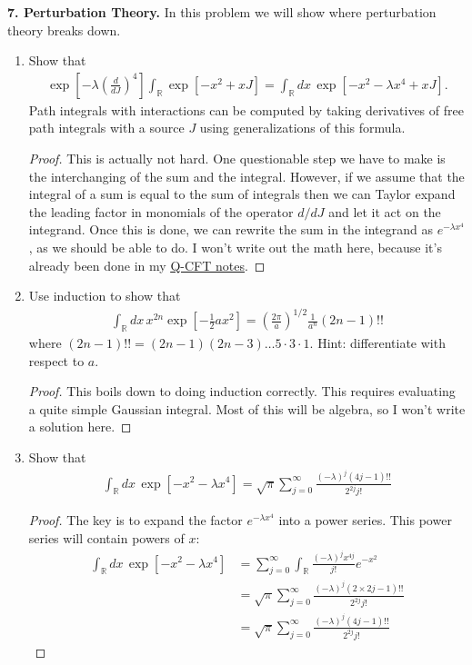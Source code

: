 \documentclass{book}
\theoremstyle{definition}
\newcommand{\R}{\mathbb{R}}
\newcommand{\nn}{\nonumber}
\newcommand{\f}[2]{\frac{#1}{#2}}
\newcommand{\lp}{\left(}
\newcommand{\rp}{\right)}
\newcommand{\lb}{\left[}
\newcommand{\rb}{\right]}
\begin{document}
\noindent \textbf{7. Perturbation Theory.}  In this problem we will show where perturbation theory breaks down.	
\begin{enumerate}
	\item Show that
	\begin{align}
	\exp\lb -\lambda\lp \f{d}{dJ} \rp^4 \rb\int_\R \exp\lb -x^2 + xJ \rb = \int_\R dx\,\exp\lb -x^2 - \lambda x^4 + xJ \rb.
	\end{align}
	Path integrals with interactions can be computed by taking derivatives of free path integrals with a source $J$ using generalizations of this formula. 
	\begin{proof}
			This is actually not hard. One questionable step we have to make is the interchanging of the sum and the integral. However, if we assume that the integral of a sum is equal to the sum of integrals then we can Taylor expand the leading factor in monomials of the operator $d/dJ$ and let it act on the integrand. Once this is done, we can rewrite the sum in the integrand as $e^{-\lambda x^4}$, as we should be able to do. I won't write out the math here, because it's already been done in my \href{https://huanqbui.com/LaTeX 20projects/HuanBui_QM/HuanBui_QM.pdf}{\underline{Q-CFT notes}}. 
	\end{proof}
	
	
	\item Use induction to show that
	\begin{align}
	\int_\R dx\, x^{2n}\exp\lb -\f{1}{2}ax^2 \rb = \lp \f{2\pi}{a} \rp^{1/2}\f{1}{a^n}(2n-1)!!
	\end{align}
	where $(2n-1)!! = (2n-1)(2n-3)\dots 5\cdot 3\cdot 1$. Hint: differentiate with respect to $a$. 
	\begin{proof}
		This boils down to doing induction correctly. This requires evaluating a quite simple Gaussian integral. Most of this will be algebra, so I won't write a solution here.
	\end{proof}


	\item Show that 
	\begin{align}
	\int_\R dx\,\exp\lb -x^2 - \lambda x^4 \rb = \sqrt{\pi}\sum^\infty_{j=0}\f{(-\lambda)^j (4j-1)!!}{2^{2j}j!}
	\end{align}
	\begin{proof}
		The key is to expand the factor $e^{-\lambda x^4}$ into a power series. This power series will contain powers of $x$:
		\begin{align}
		\int_\R dx\,\exp\lb -x^2 - \lambda x^4 \rb &= \sum_{j=0}^\infty \int_\R \f{(-\lambda)^j x^{4j}}{j!}e^{-x^2}\nn\\
		&= \sqrt{\pi}\sum^\infty_{j=0}\f{(-\lambda)^j (2\times 2j - 1)!!}{2^{2j}j!}\nn\\
		&= \sqrt{\pi}\sum^\infty_{j=0}\f{(-\lambda)^j (4j-1)!!}{2^{2j}j!}
		\end{align}
	\end{proof}
	

\end{enumerate}
\end{document}
